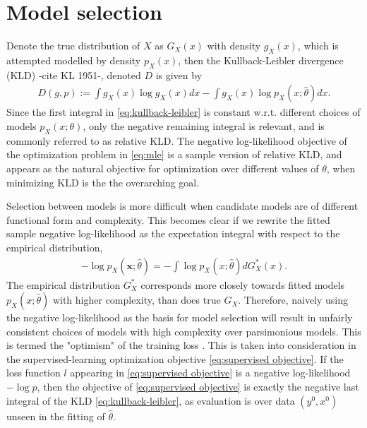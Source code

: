 \section{Model selection}
\label{sec:model selection}


Denote the true distribution of $X$ as $G_X(x)$ with density $g_X(x)$, which is attempted modelled by density $p_X(x)$, then the Kullback-Leibler divergence (KLD) -cite KL 1951-, denoted $D$ is given by 
\begin{align}\label{eq:kullback-leibler}
	D(g,p)
	:= \int g_X(x)\log g_X(x) dx - \int g_X(x)\log p_X(x;\hat{\theta}) dx.
\end{align}
Since the first integral in \eqref{eq:kullback-leibler} is constant w.r.t. different choices of models $p_X(x;\theta)$, only the negative remaining integral is relevant, and is commonly referred to as relative KLD.
The negative log-likelihood objective of the optimization problem in \eqref{eq:mle} is a sample version of relative KLD, and appears as the natural objective for optimization over different values of $\theta$, when minimizing KLD is the the overarching goal.

Selection between models is more difficult when candidate models are of different functional form and complexity.
This becomes clear if we rewrite the fitted sample negative log-likelihood as the expectation integral with respect to the empirical distribution,
\begin{align}\label{eq:loss-wrt-empirical-distribution}
	-\log p_X(\mathbf{x};\hat\theta) = -\int \log p_X(x;\hat{\theta}) dG_X^*(x).
\end{align}
The empirical distribution $G_X^*$ corresponds more closely towards fitted models $p_X(x;\hat\theta)$ with higher complexity, than does true $G_X$.
Therefore, naively using the negative log-likelihood as the basis for model selection will result in unfairly consistent choices of models with high complexity over parsimonious models.
This is termed the "optimism" of the training loss \citep{friedman2001elements}.
This is taken into consideration in the supervised-learning optimization objective \eqref{eq:supervised objective}.
If the loss function $l$ appearing in \eqref{eq:supervised objective} is a negative log-likelihood $-\log p$, then the objective of \eqref{eq:supervised objective} is exactly the negative last integral of the KLD \eqref{eq:kullback-leibler}, as evaluation is over data $(y^0,x^0)$ unseen in the fitting of $\hat\theta$.

